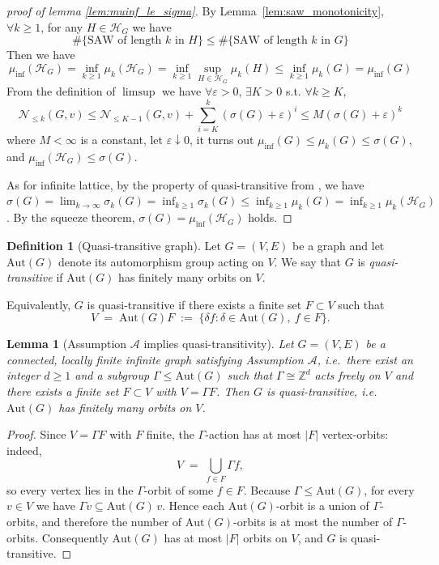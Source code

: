 \documentclass[a4paper,11pt]{article}
\theoremstyle{plain}
\newtheorem{lemma}[theorem]{Lemma}
\theoremstyle{definition}
\newtheorem{definition}[theorem]{Definition}
\theoremstyle{remark}
\newcommand{\1}{\mathbf{1}}
\begin{document}
\begin{proof}[proof of lemma \ref{lem:muinf_le_sigma}]
    By Lemma~\ref{lem:saw_monotonicity}, $\forall k\ge1$, for any $H\in\mathcal{H}_G$ we have 
    $$\#\{\text{SAW of length $k$ in $H$}\}\le\#\{\text{SAW of length $k$ in $G$}\}$$
    Then we have 
    $$\mu_{\inf}(\mathcal{H}_G)=\inf_{k\ge1}\mu_{k}(\mathcal{H}_G)=\inf_{k\ge1}\sup_{H\in\mathcal{H}_G}\mu_{k}(H)\le\inf_{k\ge1}\mu_{k}(G)=\mu_{\inf}(G)$$
    From the definition of $\limsup$ we have $\forall\varepsilon>0$, $\exists K>0$ s.t. $\forall k\ge K$,
    $$\mathcal{N}_{\leq k}(G,v)\le\mathcal{N}_{\leq K-1}(G,v)+\sum^k_{i=K}(\sigma(G)+\varepsilon)^i\le M(\sigma(G)+\varepsilon)^k$$
    where $M<\infty$ is a constant, let $\varepsilon\downarrow0$, it turns out $\mu_{\inf}(G)\le\mu_k(G)\le\sigma(G)$, and $\mu_{\inf}(\mathcal{H}_G)\leq \sigma(G)$.

    As for infinite lattice, by the property of quasi-transitive from \cite{grimmett2015bounds}, we have $\sigma(G)=\lim_{k\to\infty}\sigma_k(G)=\inf_{k\ge1}\sigma_k(G)\le\inf_{k\ge1}\mu_k(G)=\inf_{k\ge1}\mu_k(\mathcal{H}_G)$. By the squeeze theorem, $\sigma(G)=\mu_{\inf}(\mathcal{H}_G)$ holds.
\end{proof}

\begin{definition}[Quasi-transitive graph]
Let $G=(V,E)$ be a graph and let $\mathrm{Aut}(G)$ denote its automorphism group acting on $V$.
We say that $G$ is \emph{quasi-transitive} if $\mathrm{Aut}(G)$ has finitely many orbits on $V$.

Equivalently, $G$ is quasi-transitive if there exists a finite set $F\subset V$ such that
\[
V \;=\; \mathrm{Aut}(G)F \;:=\; \{\delta f: \delta\in\mathrm{Aut}(G),\ f\in F\}.
\]
\end{definition}

\begin{lemma}[Assumption $\mathcal{A}$ implies quasi-transitivity]
\label{lem:assumptionA_implies_quasitransitive}
Let $G=(V,E)$ be a connected, locally finite infinite graph satisfying Assumption $\mathcal{A}$, i.e.\ there exist an integer $d\ge 1$ and a subgroup $\Gamma\le \mathrm{Aut}(G)$ such that $\Gamma\cong \mathbb{Z}^d$ acts freely on $V$
and there exists a finite set $F\subset V$ with $V=\Gamma F$.
Then $G$ is quasi-transitive, i.e.\ $\mathrm{Aut}(G)$ has finitely many orbits on $V$.
\end{lemma}

\begin{proof}
Since $V=\Gamma F$ with $F$ finite, the $\Gamma$-action has at most $|F|$ vertex-orbits:
indeed,
\[
V \;=\; \bigcup_{f\in F} \Gamma f,
\]
so every vertex lies in the $\Gamma$-orbit of some $f\in F$.
Because $\Gamma\le \mathrm{Aut}(G)$, for every $v\in V$ we have $\Gamma v \subseteq \mathrm{Aut}(G)\,v$.
Hence each $\mathrm{Aut}(G)$-orbit is a union of $\Gamma$-orbits, and therefore the number of $\mathrm{Aut}(G)$-orbits is at most the number of $\Gamma$-orbits.
Consequently $\mathrm{Aut}(G)$ has at most $|F|$ orbits on $V$, and $G$ is quasi-transitive.
\end{proof}
\end{document}
